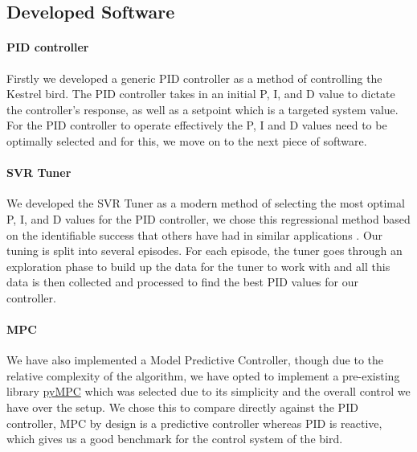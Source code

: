     \subsection{Developed Software}

    \paragraph{PID controller} Firstly we developed a generic PID
    controller as a method of controlling the Kestrel bird. The PID
    controller takes in an initial P, I, and D value to dictate the
    controller's response, as well as a setpoint which is a targeted
    system value. For the PID controller to operate effectively the
    P, I and D values need to be optimally selected and for this, we
    move on to the next piece of software.
    
    \paragraph{SVR Tuner} We developed the SVR Tuner as a modern method
    of selecting the most optimal P, I, and D values for the PID controller,
    we chose this regressional method based on the identifiable success that
    others have had in similar applications \cite{12}. Our tuning is split into
    several episodes. For each episode, the tuner goes through an exploration
    phase to build up the data for the tuner to work with and all this data
    is then collected and processed to find the best PID values for our controller.

    \paragraph{MPC} We have also implemented a Model Predictive Controller, though
    due to the relative complexity of the algorithm, we have opted to implement a
    pre-existing library \href{https://github.com/forgi86/pyMPC}{pyMPC} which was selected due to its simplicity and the 
    overall control we have over the setup. We chose this to compare directly
    against the PID controller, MPC by design is a predictive controller
    whereas PID is reactive, which gives us a good benchmark for the control
    system of the bird.

